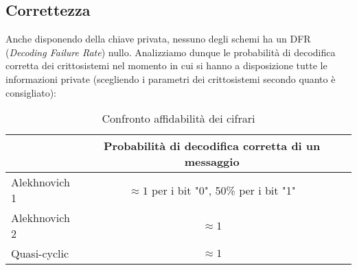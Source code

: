 \documentclass[12pt, a4paper]{report}
\theoremstyle{definition}
\begin{document}
			\subsection{Correttezza}
				Anche disponendo della chiave privata, nessuno degli schemi ha un DFR (\emph{Decoding Failure Rate}) nullo. Analizziamo dunque le probabilità di decodifica corretta dei crittosistemi nel momento in cui si hanno a disposizione tutte le informazioni private (scegliendo i parametri dei crittosistemi secondo quanto è consigliato):
				\begin{table}[H]
					\centering
					\begin{tabular}[t]{lcc}
						\hline
						&Probabilità di decodifica corretta di un messaggio\\
						\hline
						Alekhnovich 1&$\approx1$ per i bit "0", 50\% per i bit "1"\\
						Alekhnovich 2&$\approx1$\\
						Quasi-cyclic&$\approx1$\\
						\hline
					\end{tabular}
					\caption{Confronto affidabilità dei cifrari}
				\end{table}
	
	\listoftables
	
	\printbibliography
\end{document}
